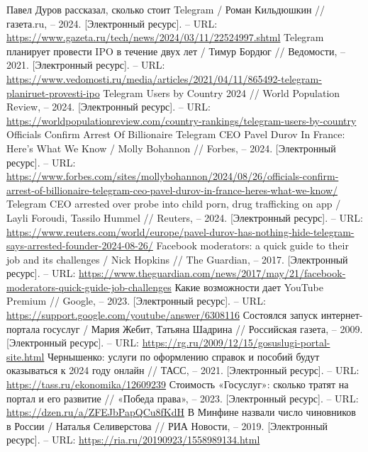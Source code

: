 \documentclass{article}
\begin{document}
\begin{thebibliography}{2}
 Павел Дуров рассказал, сколько стоит Telegram / Роман Кильдюшкин // газета.ru, – 2024. [Электронный ресурс]. – URL: \url{https://www.gazeta.ru/tech/news/2024/03/11/22524997.shtml}
 Telegram планирует провести IPO в течение двух лет / Тимур Бордюг // Ведомости, – 2021. [Электронный ресурс]. – URL: \url{https://www.vedomosti.ru/media/articles/2021/04/11/865492-telegram-planiruet-provesti-ipo}
 Telegram Users by Country 2024 // World Population Review, – 2024. [Электронный ресурс]. – URL: \url{https://worldpopulationreview.com/country-rankings/telegram-users-by-country}
 Officials Confirm Arrest Of Billionaire Telegram CEO Pavel Durov In France: Here’s What We Know / Molly Bohannon // Forbes, – 2024. [Электронный ресурс]. – URL: \url{https://www.forbes.com/sites/mollybohannon/2024/08/26/officials-confirm-arrest-of-billionaire-telegram-ceo-pavel-durov-in-france-heres-what-we-know/}
 Telegram CEO arrested over probe into child porn, drug trafficking on app / Layli Foroudi, Tassilo Hummel // Reuters, – 2024. [Электронный ресурс]. – URL: \url{https://www.reuters.com/world/europe/pavel-durov-has-nothing-hide-telegram-says-arrested-founder-2024-08-26/}
 Facebook moderators: a quick guide to their job and its challenges / Nick Hopkins // The Guardian, – 2017. [Электронный ресурс]. – URL: \url{https://www.theguardian.com/news/2017/may/21/facebook-moderators-quick-guide-job-challenges}
 Какие возможности дает YouTube Premium // Google, – 2023. [Электронный ресурс]. – URL: \url{https://support.google.com/youtube/answer/6308116}
 Состоялся запуск интернет-портала госуслуг / Мария Жебит, Татьяна Шадрина // Российская газета, – 2009. [Электронный ресурс]. – URL: \url{https://rg.ru/2009/12/15/gosuslugi-portal-site.html}
 Чернышенко: услуги по оформлению справок и пособий будут оказываться к 2024 году онлайн // ТАСС, – 2021. [Электронный ресурс]. – URL: \url{https://tass.ru/ekonomika/12609239}
 Стоимость «Госуслуг»: сколько тратят на портал и его развитие // «Победа права», – 2023. [Электронный ресурс]. – URL: \url{https://dzen.ru/a/ZFEJbPapQCu8fKdH}
 В Минфине назвали число чиновников в России / Наталья Селиверстова // РИА Новости, – 2019. [Электронный ресурс]. – URL: \url{https://ria.ru/20190923/1558989134.html}

\end{thebibliography}
\end{document}
